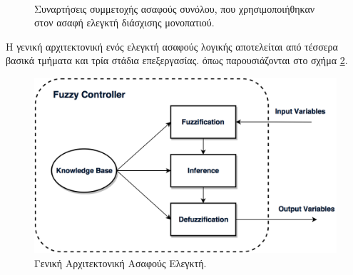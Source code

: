 \begin{figure}
	\centering
	\\
	\caption{Συναρτήσεις συμμετοχής ασαφούς συνόλου, που χρησιμοποιήθηκαν στον ασαφή ελεγκτή διάσχισης μονοπατιού.}
	\label{fig:membership_functions}
\end{figure}

\bigskip
Η γενική αρχιτεκτονική ενός ελεγκτή ασαφούς λογικής αποτελείται από τέσσερα βασικά τμήματα και τρία στάδια επεξεργασίας. όπως παρουσιάζονται στο σχήμα \ref{fig:fuzzy_controller_architecture}.

\begin{figure}[!ht]
	\centering
	\includegraphics[width=0.6\linewidth]{Chapters/Chapter3/Figures/fuzzy_controller_architecture.png}
	\caption{Γενική Αρχιτεκτονική Ασαφούς Ελεγκτή.}
	\label{fig:fuzzy_controller_architecture}
\end{figure}

